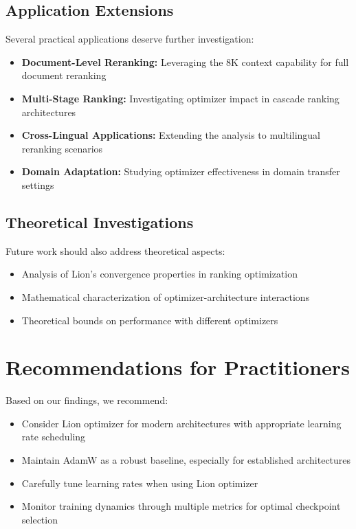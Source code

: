 \subsection{Application Extensions}

Several practical applications deserve further investigation:

\begin{itemize}
    \item \textbf{Document-Level Reranking:} Leveraging the 8K context capability for full document reranking
    \item \textbf{Multi-Stage Ranking:} Investigating optimizer impact in cascade ranking architectures
    \item \textbf{Cross-Lingual Applications:} Extending the analysis to multilingual reranking scenarios
    \item \textbf{Domain Adaptation:} Studying optimizer effectiveness in domain transfer settings
\end{itemize}

\subsection{Theoretical Investigations}

Future work should also address theoretical aspects:

\begin{itemize}
    \item Analysis of Lion's convergence properties in ranking optimization
    \item Mathematical characterization of optimizer-architecture interactions
    \item Theoretical bounds on performance with different optimizers
\end{itemize}

\section{Recommendations for Practitioners}

Based on our findings, we recommend:

\begin{itemize}
    \item Consider Lion optimizer for modern architectures with appropriate learning rate scheduling
    \item Maintain AdamW as a robust baseline, especially for established architectures
    \item Carefully tune learning rates when using Lion optimizer
    \item Monitor training dynamics through multiple metrics for optimal checkpoint selection
\end{itemize}

